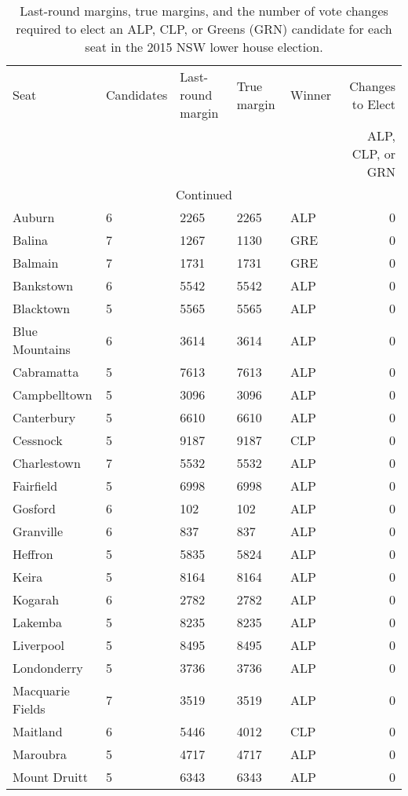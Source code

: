 \documentclass{article}
\begin{document}
\begin{center}
\begin{longtable}{lllllr}
\caption{Last-round margins, true margins, and the number of vote changes required to elect an ALP, CLP, or Greens (GRN) candidate for each seat in the 2015 NSW lower house election.}
\label{tab:NSWchangesElectALP_CLP_GRN}\tabularnewline
\hline
	Seat &  Candidates & Last-round margin & True margin & Winner & Changes to Elect \\
	     &             &                   &             &     & ALP, CLP, or GRN\\
\hline
\endhead
\hline
\multicolumn{6}{c}{Continued}\\
\endfoot
\endlastfoot
Auburn & 6 & 2265 & 2265 & ALP & 0\\
Balina & 7 & 1267 & 1130 & GRE & 0\\
Balmain & 7 & 1731 & 1731 & GRE & 0\\
Bankstown & 6 & 5542 & 5542 & ALP & 0\\
Blacktown & 5 & 5565 & 5565 & ALP & 0\\
Blue Mountains & 6 & 3614 & 3614 & ALP & 0\\
Cabramatta & 5 & 7613 & 7613 & ALP & 0\\
Campbelltown & 5 & 3096 & 3096 & ALP & 0\\
Canterbury & 5 & 6610 & 6610 & ALP & 0\\
Cessnock & 5 & 9187 & 9187 & CLP & 0\\
Charlestown & 7 & 5532 & 5532 & ALP & 0\\
Fairfield & 5 & 6998 & 6998 & ALP & 0\\
Gosford & 6 & 102 & 102 & ALP & 0\\
Granville & 6 & 837 & 837 & ALP & 0\\
Heffron & 5 & 5835 & 5824 & ALP & 0\\
Keira & 5 & 8164 & 8164 & ALP & 0\\
Kogarah & 6 & 2782 & 2782 & ALP & 0\\
Lakemba & 5 & 8235 & 8235 & ALP & 0\\
Liverpool & 5 & 8495 & 8495 & ALP & 0\\
Londonderry & 5 & 3736 & 3736 & ALP & 0\\
Macquarie Fields & 7 & 3519 & 3519 & ALP & 0\\
Maitland & 6 & 5446 & 4012 & CLP & 0\\
Maroubra & 5 & 4717 & 4717 & ALP & 0\\
Mount Druitt & 5 & 6343 & 6343 & ALP & 0\\

\end{longtable}
\end{center}
\end{document}
